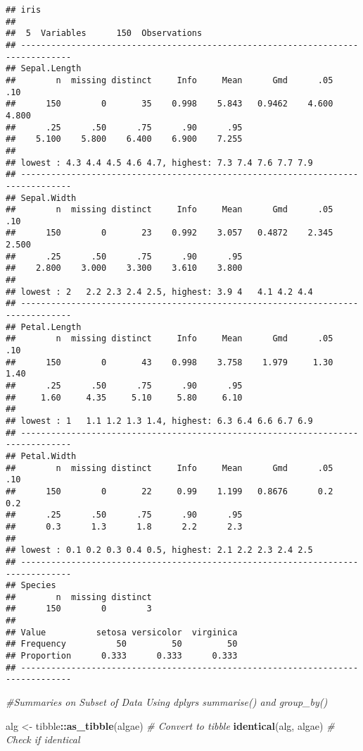\documentclass[
]{article}
\newenvironment{Shaded}{\begin{snugshade}}{\end{snugshade}}
\newcommand{\CommentTok}[1]{\textcolor[rgb]{0.56,0.35,0.01}{\textit{#1}}}
\newcommand{\FunctionTok}[1]{\textcolor[rgb]{0.13,0.29,0.53}{\textbf{#1}}}
\newcommand{\NormalTok}[1]{#1}
\newcommand{\OtherTok}[1]{\textcolor[rgb]{0.56,0.35,0.01}{#1}}
\newcommand{\SpecialCharTok}[1]{\textcolor[rgb]{0.81,0.36,0.00}{\textbf{#1}}}
\begin{document}
\begin{verbatim}
## iris 
## 
##  5  Variables      150  Observations
## --------------------------------------------------------------------------------
## Sepal.Length 
##        n  missing distinct     Info     Mean      Gmd      .05      .10 
##      150        0       35    0.998    5.843   0.9462    4.600    4.800 
##      .25      .50      .75      .90      .95 
##    5.100    5.800    6.400    6.900    7.255 
## 
## lowest : 4.3 4.4 4.5 4.6 4.7, highest: 7.3 7.4 7.6 7.7 7.9
## --------------------------------------------------------------------------------
## Sepal.Width 
##        n  missing distinct     Info     Mean      Gmd      .05      .10 
##      150        0       23    0.992    3.057   0.4872    2.345    2.500 
##      .25      .50      .75      .90      .95 
##    2.800    3.000    3.300    3.610    3.800 
## 
## lowest : 2   2.2 2.3 2.4 2.5, highest: 3.9 4   4.1 4.2 4.4
## --------------------------------------------------------------------------------
## Petal.Length 
##        n  missing distinct     Info     Mean      Gmd      .05      .10 
##      150        0       43    0.998    3.758    1.979     1.30     1.40 
##      .25      .50      .75      .90      .95 
##     1.60     4.35     5.10     5.80     6.10 
## 
## lowest : 1   1.1 1.2 1.3 1.4, highest: 6.3 6.4 6.6 6.7 6.9
## --------------------------------------------------------------------------------
## Petal.Width 
##        n  missing distinct     Info     Mean      Gmd      .05      .10 
##      150        0       22     0.99    1.199   0.8676      0.2      0.2 
##      .25      .50      .75      .90      .95 
##      0.3      1.3      1.8      2.2      2.3 
## 
## lowest : 0.1 0.2 0.3 0.4 0.5, highest: 2.1 2.2 2.3 2.4 2.5
## --------------------------------------------------------------------------------
## Species 
##        n  missing distinct 
##      150        0        3 
##                                            
## Value          setosa versicolor  virginica
## Frequency          50         50         50
## Proportion      0.333      0.333      0.333
## --------------------------------------------------------------------------------
\end{verbatim}

\begin{Shaded}
\begin{Highlighting}[]
\CommentTok{\#Summaries on Subset of Data Using dplyr\textquotesingle{}s summarise() and group\_by()}

\NormalTok{alg }\OtherTok{\textless{}{-}}\NormalTok{ tibble}\SpecialCharTok{::}\FunctionTok{as\_tibble}\NormalTok{(algae) }\CommentTok{\# Convert to tibble}
\FunctionTok{identical}\NormalTok{(alg, algae) }\CommentTok{\# Check if identical}
\end{Highlighting}
\end{Shaded}
\end{document}
